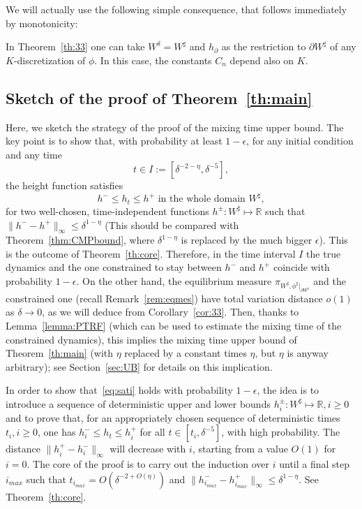 \documentclass[AHL,Unicode,longabstracts,published]{cedram}
\newcommand{\R}{\mathbb{R}}
\renewcommand{\d}{{\sharp }}
\begin{document}
We will actually use the following simple consequence, that follows immediately by monotonicity:
\begin{coro}\label{cor:33}
In Theorem~\ref{th:33} one can take $W^\delta= W^\d$ and $h_\partial$ as the restriction to $\partial W^\d$ of any $K$-discretization of $\phi$. In this case, the constants $C_n$ depend also on $K$.
\end{coro}


\subsection{Sketch of the proof of Theorem~\ref{th:main}}\label{sec:overview}

Here, we sketch the strategy of the proof of the mixing time upper bound. The key point is to show that, with probability at least $1-\epsilon$, for any initial condition and any time
\begin{equation}
t\in I:= \left[\delta^{-2-\eta},\delta^{-5}\right],
\end{equation}
the height function satisfies
\begin{equation}\label{eq:sati}
h^-\le h_t\le h^+ \text{ in the whole domain } W^\d,
\end{equation}
for two well-chosen, time-independent functions $h^\pm:W^\d\mapsto \R$ such that $\|h^--h^+\|_\infty \le \delta^{1-\eta}$ (This should be compared with Theorem~\ref{thm:CMPbound}, where $\delta^{1-\eta}$ is replaced by the much bigger $\epsilon$). This is the outcome of
Theorem~\ref{th:core}. Therefore, in the time interval $I$ the true dynamics and the one constrained to stay between $h^-$ and $h^+$ coincide with probability $1-\epsilon$. On the other hand, the equilibrium measure $\pi_{W^\d,\phi^\d|_{\partial W^\d}}$ and the constrained one (recall Remark~\ref{rem:eqmes}) have total variation distance $o(1)$ as $\delta\to0$, as we will deduce from Corollary~\ref{cor:33}. Then, thanks to Lemma~\ref{lemma:PTRF} (which can be used to estimate the mixing time of the constrained dynamics), this implies the mixing time upper bound of Theorem~\ref{th:main} (with $\eta$ replaced by a constant times $\eta$, but $\eta$ is anyway arbitrary); see Section~\ref{sec:UB} for details on this implication.

In order to show that~\eqref{eq:sati} holds with probability $1-\epsilon$, the idea is to introduce a sequence of deterministic upper and lower bounds $h^\pm_i:W^\d\mapsto \R,i\ge0$ and to prove that, for an appropriately chosen sequence of deterministic times $t_i,i\ge0$, one has $h^{-}_{i} \leq h_t \leq h^{+}_{i}$ for all $t \in [t_i, \delta^{-5}]$, with high probability. The distance $\|h_i^+-h^-_i\|_\infty$ will decrease with $i$, starting from a value $O(1)$ for $i=0$. The core of the proof is to carry out the induction over $i$ until a final step $i_{max}$ such that $t_{i_{max}}=O(\delta^{-2+O(\eta)})$ and $\|h^-_{i_{max}}-h^+_{i_{max}}\|_\infty\le \delta^{1-\eta}.$ See Theorem~\ref{th:core}.
\end{document}
